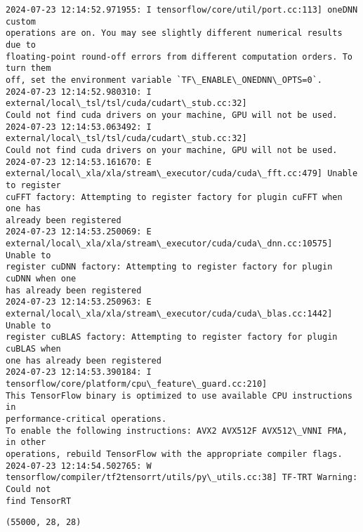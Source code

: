 \documentclass[12pt letter]{report}
\makeatletter
\newcommand{\boxspacing}{\kern\kvtcb@left@rule\kern\kvtcb@boxsep}
\newcommand{\prompt}[4]{
        {\ttfamily\llap{{\color{#2}[#3]:\hspace{3pt}#4}}\vspace{-\baselineskip}}
    }
\makeatother
\begin{document}
    \begin{Verbatim}[commandchars=\\\{\}]
2024-07-23 12:14:52.971955: I tensorflow/core/util/port.cc:113] oneDNN custom
operations are on. You may see slightly different numerical results due to
floating-point round-off errors from different computation orders. To turn them
off, set the environment variable `TF\_ENABLE\_ONEDNN\_OPTS=0`.
2024-07-23 12:14:52.980310: I external/local\_tsl/tsl/cuda/cudart\_stub.cc:32]
Could not find cuda drivers on your machine, GPU will not be used.
2024-07-23 12:14:53.063492: I external/local\_tsl/tsl/cuda/cudart\_stub.cc:32]
Could not find cuda drivers on your machine, GPU will not be used.
2024-07-23 12:14:53.161670: E
external/local\_xla/xla/stream\_executor/cuda/cuda\_fft.cc:479] Unable to register
cuFFT factory: Attempting to register factory for plugin cuFFT when one has
already been registered
2024-07-23 12:14:53.250069: E
external/local\_xla/xla/stream\_executor/cuda/cuda\_dnn.cc:10575] Unable to
register cuDNN factory: Attempting to register factory for plugin cuDNN when one
has already been registered
2024-07-23 12:14:53.250963: E
external/local\_xla/xla/stream\_executor/cuda/cuda\_blas.cc:1442] Unable to
register cuBLAS factory: Attempting to register factory for plugin cuBLAS when
one has already been registered
2024-07-23 12:14:53.390184: I tensorflow/core/platform/cpu\_feature\_guard.cc:210]
This TensorFlow binary is optimized to use available CPU instructions in
performance-critical operations.
To enable the following instructions: AVX2 AVX512F AVX512\_VNNI FMA, in other
operations, rebuild TensorFlow with the appropriate compiler flags.
2024-07-23 12:14:54.502765: W
tensorflow/compiler/tf2tensorrt/utils/py\_utils.cc:38] TF-TRT Warning: Could not
find TensorRT
    \end{Verbatim}

            \begin{tcolorbox}[breakable, size=fbox, boxrule=.5pt, pad at break*=1mm, opacityfill=0]
\prompt{Out}{outcolor}{ }{\boxspacing}
\begin{Verbatim}[commandchars=\\\{\}]
(55000, 28, 28)
\end{Verbatim}
\end{tcolorbox}
        
\end{document}
